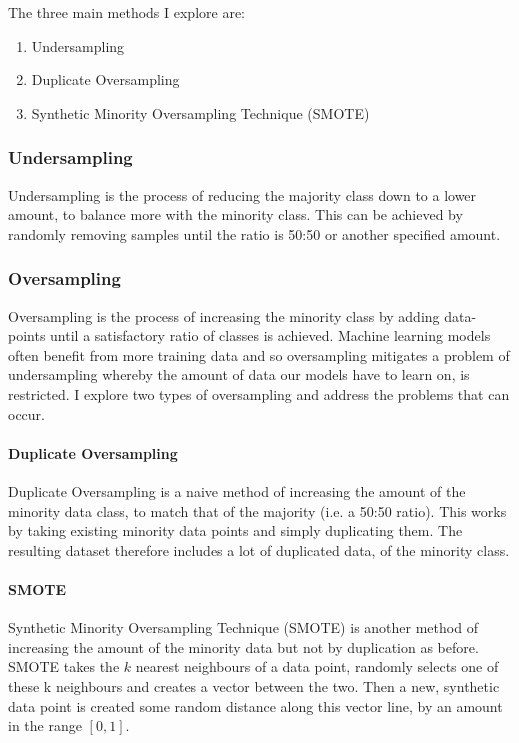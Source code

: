 \documentclass[12pt,a4paper,twoside]{report}
\begin{document}
The three main methods I explore are:

\begin{enumerate}
  \item Undersampling 
  \item Duplicate Oversampling
  \item Synthetic Minority Oversampling Technique (SMOTE)
\end{enumerate}

\subsubsection{Undersampling}
Undersampling is the process of reducing the majority class down to a lower amount, to balance more with the minority class. This can be achieved by randomly removing samples until the ratio is 50:50 or another specified amount. 

\subsubsection{Oversampling}
Oversampling is the process of increasing the minority class by adding data-points until a satisfactory ratio of classes is achieved. Machine learning models often benefit from more training data and so oversampling mitigates a problem of undersampling whereby the amount of data our models have to learn on, is restricted. 
I explore two types of oversampling and address the problems that can occur.

\paragraph{Duplicate Oversampling} 
Duplicate Oversampling is a naive method of increasing the amount of the minority data class, to match that of the majority (i.e. a 50:50 ratio). This works by taking existing minority data points and simply duplicating them. The resulting dataset therefore includes a lot of duplicated data, of the minority class. 

\paragraph{SMOTE} 
Synthetic Minority Oversampling Technique (SMOTE)\cite{DBLP:journals/corr/abs-1106-1813} is another method of increasing the amount of the minority data but not by duplication as before. SMOTE takes the $k$ nearest neighbours of a data point, randomly selects one of these k neighbours and creates a vector between the two. Then a new, synthetic data point is created some random distance along this vector line, by an amount in the range $[0,1]$.
\end{document}
